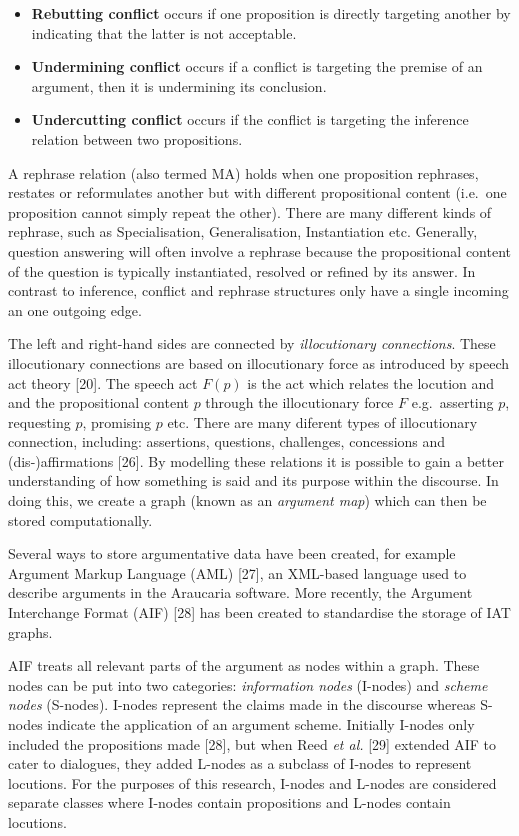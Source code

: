 \documentclass[twocolumn,twoside]{article}
\providecommand{\tightlist}{%
  \setlength{\itemsep}{0pt}\setlength{\parskip}{0pt}}
\begin{document}
\begin{itemize}
\tightlist
\item
  \textbf{Rebutting conflict} occurs if one proposition is directly
  targeting another by indicating that the latter is not acceptable.
\item
  \textbf{Undermining conflict} occurs if a conflict is targeting the
  premise of an argument, then it is undermining its conclusion.
\item
  \textbf{Undercutting conflict} occurs if the conflict is targeting the
  inference relation between two propositions.
\end{itemize}

A rephrase relation (also termed MA) holds when one proposition
rephrases, restates or reformulates another but with different
propositional content (i.e.~one proposition cannot simply repeat the
other). There are many different kinds of rephrase, such as
Specialisation, Generalisation, Instantiation etc. Generally, question
answering will often involve a rephrase because the propositional
content of the question is typically instantiated, resolved or refined
by its answer. In contrast to inference, conflict and rephrase
structures only have a single incoming an one outgoing edge.

The left and right-hand sides are connected by \emph{illocutionary
connections}. These illocutionary connections are based on illocutionary
force as introduced by speech act theory {[}20{]}. The speech act
\(F(p)\) is the act which relates the locution and and the propositional
content \(p\) through the illocutionary force \(F\) e.g.~asserting
\(p\), requesting \(p\), promising \(p\) etc. There are many diferent
types of illocutionary connection, including: assertions, questions,
challenges, concessions and (dis-)affirmations {[}26{]}. By modelling
these relations it is possible to gain a better understanding of how
something is said and its purpose within the discourse. In doing this,
we create a graph (known as an \emph{argument map}) which can then be
stored computationally.

Several ways to store argumentative data have been created, for example
Argument Markup Language (AML) {[}27{]}, an XML-based language used to
describe arguments in the Araucaria software. More recently, the
Argument Interchange Format (AIF) {[}28{]} has been created to
standardise the storage of IAT graphs.

AIF treats all relevant parts of the argument as nodes within a graph.
These nodes can be put into two categories: \emph{information nodes}
(I-nodes) and \emph{scheme nodes} (S-nodes). I-nodes represent the
claims made in the discourse whereas S-nodes indicate the application of
an argument scheme. Initially I-nodes only included the propositions
made {[}28{]}, but when Reed \emph{et al.} {[}29{]} extended AIF to
cater to dialogues, they added L-nodes as a subclass of I-nodes to
represent locutions. For the purposes of this research, I-nodes and
L-nodes are considered separate classes where I-nodes contain
propositions and L-nodes contain locutions.
\end{document}
